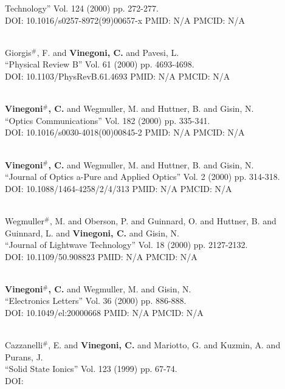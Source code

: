 Technology'' Vol. 124 (2000) pp. 272-277. \\ DOI: 10.1016/s0257-8972(99)00657-x PMID: N/A PMCID: N/A\item {} \\ Giorgis$^\#$, F. and {\bf Vinegoni, C.} and Pavesi, L. \\ ``Physical Review B'' Vol. 61 (2000) pp. 4693-4698. \\ DOI: 10.1103/PhysRevB.61.4693 PMID: N/A PMCID: N/A\item {} \\ {\bf Vinegoni$^\#$, C.} and Wegmuller, M. and Huttner, B. and Gisin, N. \\ ``Optics Communications'' Vol. 182 (2000) pp. 335-341. \\ DOI: 10.1016/s0030-4018(00)00845-2 PMID: N/A PMCID: N/A\item {} \\ {\bf Vinegoni$^\#$, C.} and Wegmuller, M. and Huttner, B. and Gisin, N. \\ ``Journal of Optics a-Pure and Applied Optics'' Vol. 2 (2000) pp. 314-318. \\ DOI: 10.1088/1464-4258/2/4/313 PMID: N/A PMCID: N/A\item {} \\ Wegmuller$^\#$, M. and Oberson, P. and Guinnard, O. and Huttner, B. and Guinnard, L. and {\bf Vinegoni, C.} and Gisin, N. \\ ``Journal of Lightwave Technology'' Vol. 18 (2000) pp. 2127-2132. \\ DOI: 10.1109/50.908823 PMID: N/A PMCID: N/A\item {} \\ {\bf Vinegoni$^\#$, C.} and Wegmuller, M. and Gisin, N. \\ ``Electronics Letters'' Vol. 36 (2000) pp. 886-888. \\ DOI: 10.1049/el:20000668 PMID: N/A PMCID: N/A\item {} \\ Cazzanelli$^\#$, E. and {\bf Vinegoni, C.} and Mariotto, G. and Kuzmin, A. and Purans, J. \\ ``Solid State Ionics'' Vol. 123 (1999) pp. 67-74. \\ DOI: 